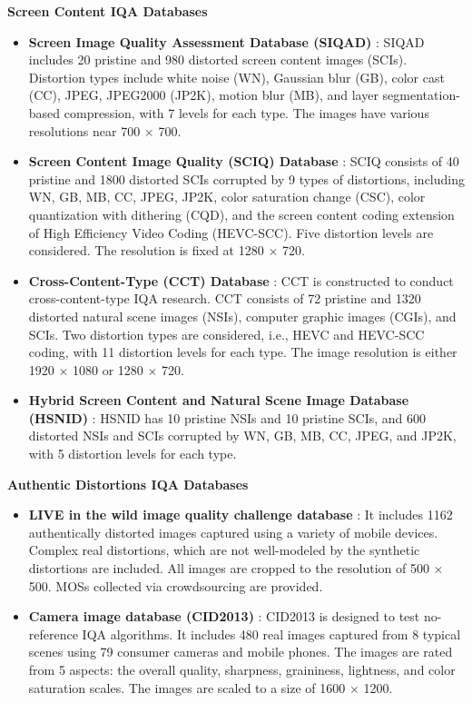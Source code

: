\textbf{Screen Content IQA Databases}
\begin{itemize}
    \item \textbf{Screen Image Quality Assessment Database (SIQAD)} \cite{SIQAD}: SIQAD includes 20 pristine and 980 distorted screen content images (SCIs). Distortion types include white noise (WN), Gaussian blur (GB), color cast (CC), JPEG, JPEG2000 (JP2K), motion blur (MB), and layer segmentation-based compression, with 7 levels for each type. The images have various resolutions near 700 $\times$ 700.
    \item \textbf{Screen Content Image Quality (SCIQ) Database} \cite{SCIQ}: SCIQ consists of 40 pristine and 1800 distorted SCIs corrupted by 9 types of distortions, including WN, GB, MB, CC, JPEG, JP2K, color saturation change (CSC), color quantization with dithering (CQD), and the screen content coding extension of High Efficiency Video Coding (HEVC-SCC). Five distortion levels are considered. The resolution is fixed at 1280 $\times$ 720.
    \item \textbf{Cross-Content-Type (CCT) Database} \cite{CCT}: CCT is constructed to conduct cross-content-type IQA research. CCT consists of 72 pristine and 1320 distorted natural scene images (NSIs), computer graphic images (CGIs), and SCIs. Two distortion types are considered, i.e., HEVC and HEVC-SCC coding, with 11 distortion levels for each type. The image resolution is either 1920 $\times$ 1080 or 1280 $\times$ 720.
    \item \textbf{Hybrid Screen Content and Natural Scene Image Database (HSNID)} \cite{HSNID}: HSNID has 10 pristine NSIs and 10 pristine SCIs, and 600 distorted NSIs and SCIs corrupted by WN, GB, MB, CC, JPEG, and JP2K, with 5 distortion levels for each type.
\end{itemize}

\textbf{Authentic Distortions IQA Databases}
\begin{itemize}
    \item \textbf{LIVE in the wild image quality challenge database} \cite{LIVEWild}: It includes 1162 authentically distorted images captured using a variety of mobile devices. Complex real distortions, which are not well-modeled by the synthetic distortions are included. All images are cropped to the resolution of 500 $\times$ 500. MOSs collected via crowdsourcing are provided.
    \item \textbf{Camera image database (CID2013)} \cite{CID2013}: CID2013 is designed to test no-reference IQA algorithms. It includes 480 real images captured from 8 typical scenes using 79 consumer cameras and mobile phones. The images are rated from 5 aspects: the overall quality, sharpness, graininess, lightness, and color saturation scales. The images are scaled to a size of 1600 $\times$ 1200.
\end{itemize}


